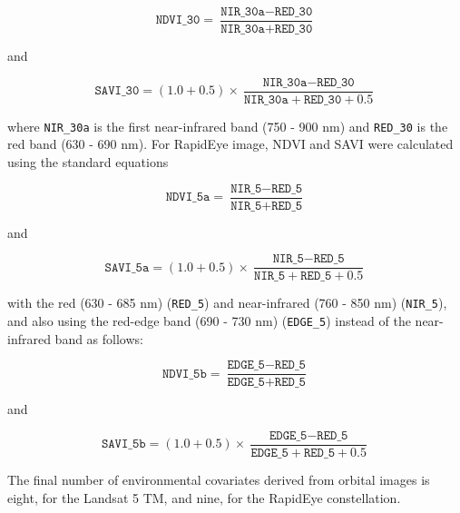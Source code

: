 \begin{equation}
  \texttt{NDVI\_30} = \frac{\texttt{NIR\_30a} - \texttt{RED\_30}}{\texttt{NIR\_30a} + \texttt{RED\_30}}
\end{equation}\label{eq:NDVI30}

\noindent and

\begin{equation}
  \texttt{SAVI\_30} = (1.0 + 0.5) \times \frac{\texttt{NIR\_30a} - \texttt{RED\_30}}{\texttt{NIR\_30a} + \texttt{RED\_30} + 0.5}
\end{equation}\label{eq:SAVI30}

\noindent where \texttt{NIR\_30a} is the first near-infrared band (750 - 900 nm) and \texttt{RED\_30} is the red band (630 - 690 nm). For RapidEye image, NDVI and SAVI were calculated using the standard equations

\begin{equation}
  \texttt{NDVI\_5a} = \frac{\texttt{NIR\_5} - \texttt{RED\_5}}{\texttt{NIR\_5} + \texttt{RED\_5}}
\end{equation}\label{eq:NDVI5a}

\noindent and

\begin{equation}
  \texttt{SAVI\_5a} = (1.0 + 0.5) \times \frac{\texttt{NIR\_5} - \texttt{RED\_5}}{\texttt{NIR\_5} + \texttt{RED\_5} + 0.5}
\end{equation}\label{eq:SAVI5a}

\noindent with the red (630 - 685 nm) (\texttt{RED\_5}) and near-infrared (760 - 850 nm) (\texttt{NIR\_5}), and also using the red-edge band (690 - 730 nm) (\texttt{EDGE\_5}) instead of the near-infrared band as follows:

\begin{equation}
  \texttt{NDVI\_5b} = \frac{\texttt{EDGE\_5} - \texttt{RED\_5}}{\texttt{EDGE\_5} + \texttt{RED\_5}}
\end{equation}\label{eq:NDVI5a}

\noindent and

\begin{equation}
  \texttt{SAVI\_5b} = (1.0 + 0.5) \times \frac{\texttt{EDGE\_5} - \texttt{RED\_5}}{\texttt{EDGE\_5} + \texttt{RED\_5} + 0.5}
\end{equation}\label{eq:SAVI5a}

The final number of environmental covariates derived from orbital images is eight, for the Landsat 5 TM, and nine, for the RapidEye constellation.


